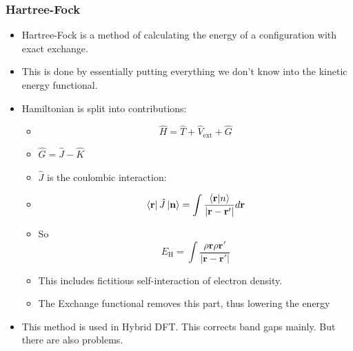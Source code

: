 \documentclass[11pt]{article}
\begin{document}
\begin{enumerate}
\subsubsection{Hartree-Fock}
\label{sec:org987b14d}
\begin{itemize}
\item Hartree-Fock is a method of calculating the energy of a configuration
with exact exchange.
\item This is done by essentially putting everything we don't know into the
kinetic energy functional.
\item Hamiltonian is split into contributions:
\begin{itemize}
\item \[\hat{H} = \hat{T} + \hat{V}_{ \text{ext} } + \hat{G}\]
\item \(\hat{G} = \hat{J} - \hat{K}\)
\item \(\hat{J}\) is the coulombic interaction:
\item \[ \bra{ \mathbf{r} } \hat{J} \ket{ \mathbf{n} } = \int \frac{ \bra{\mathbf{r}}\ket{n} }{|\mathbf{r} - \mathbf{r'}  |}d\mathbf{r} \]
\item So \[ E_{\text{H}} = \int \frac{\rho{\mathbf{r}\rho{\mathbf{r}'}}}{|\mathbf{r} - \mathbf{r'}|}\]
\item This includes fictitious self-interaction of electron density.
\item The Exchange functional removes this part, thus lowering the energy
\end{itemize}

\item This method is used in Hybrid DFT. This corrects band gaps mainly. But
there are also problems.
\end{itemize}


\end{enumerate}
\end{document}
